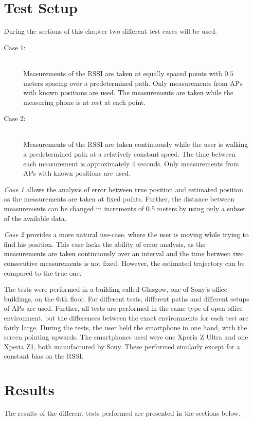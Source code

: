 \documentclass{LTHthesis}
\begin{document}
%
\section{Test Setup}
\label{sec:test_setup}
%
During the sections of this chapter two different test cases will be used.
\begin{description}
%
\item[Case 1:] \hfill \\
%
Measurements of the RSSI are taken at equally spaced points with $0.5$ meters spacing over a predetermined path. Only measurements from APs with known positions are used. The measurements are taken while the measuring phone is at rest at each point.  
%
\item[Case 2:] \hfill \\
%
Measurements of the RSSI are taken continuously while the user is walking a predetermined path at a relatively constant speed. The time between each measurement is approximately 4 seconds. Only measurements from APs with known positions are used.  
%
\end{description}
%
\emph{Case 1} allows the analysis of error between true position and estimated position as the measurements are taken at fixed points. Further, the distance between measurements can be changed in increments of 0.5 meters by using only a subset of the available data. 

\emph{Case 2} provides a more natural use-case, where the user is moving while trying to find his position. This case lacks the ability of error analysis, as the measurements are taken continuously over an interval and the time between two consecutive measurements is not fixed. However, the estimated trajectory can be compared to the true one.   

The tests were performed in a building called Glasgow, one of Sony's office buildings, on the 6:th floor. For different tests, different paths and different setups of APs are used. Further, all tests are performed in the same type of open office environment, but the differences between the exact environments for each test are fairly large. During the tests, the user held the smartphone in one hand, with the screen pointing upwards. The smartphones used were one Xperia Z Ultra and one Xperia Z1, both manufactured by Sony. These performed similarly except for a constant bias on the RSSI.
%
\section{Results}
\label{environment_results}
%
The results of the different tests performed are presented in the sections below. 
%
\end{document}
